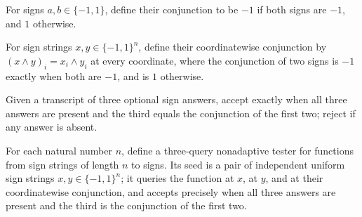 \begin{definition}
\label{FABL.signAnd}
\leanok
{}
For signs $a,b\in\{-1,1\}$, define their conjunction to be $-1$ if both signs are $-1$,
and $1$ otherwise.
\end{definition}

\begin{definition}
\label{FABL.signCubeAnd}
\leanok
{}
For sign strings $x,y\in\{-1,1\}^n$, define their coordinatewise conjunction by
$(x\wedge y)_i=x_i\wedge y_i$ at every coordinate, where the conjunction of two signs is
$-1$ exactly when both are $-1$, and is $1$ otherwise.
\end{definition}

\begin{definition}
\label{FABL.signAndTranscriptAccept}
\leanok
{}
Given a transcript of three optional sign answers, accept exactly when all three answers
are present and the third equals the conjunction of the first two; reject if any answer
is absent.
\end{definition}

\begin{definition}
\label{FABL.signAndFunctionTester}
\leanok
{}
For each natural number $n$, define a three-query nonadaptive tester for functions from
sign strings of length $n$ to signs. Its seed is a pair of independent uniform sign
strings $x,y\in\{-1,1\}^n$; it queries the function at $x$, at $y$, and at their
coordinatewise conjunction, and accepts precisely when all three answers are present and
the third is the conjunction of the first two.
\end{definition}

